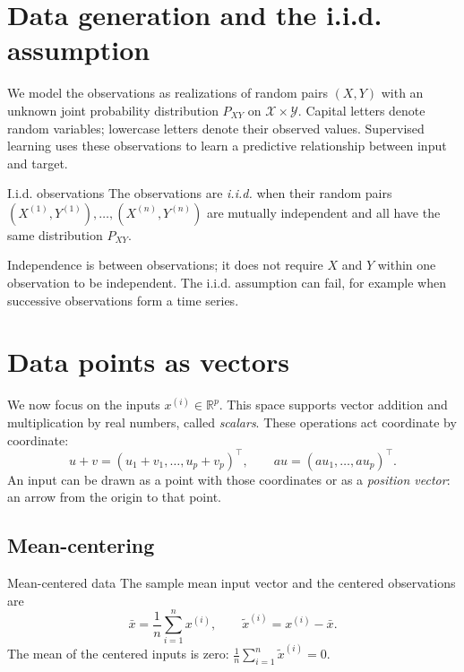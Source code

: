 \documentclass[a4paper,12pt,oneside]{report}
\begin{document}
\section{Data generation and the i.i.d. assumption}

We model the observations as realizations of random pairs $(X,Y)$
with an unknown joint probability distribution $P_{XY}$ on
$\mathcal{X}\times\mathcal{Y}$. Capital letters denote random variables;
lowercase letters denote their observed values. Supervised learning
uses these observations to learn a predictive relationship between
input and target.

\begin{frameddefn}{I.i.d. observations}
\label{def:iid}
The observations are \emph{i.i.d.} when their random pairs
$(X^{(1)},Y^{(1)}),\ldots,(X^{(n)},Y^{(n)})$ are mutually independent
and all have the same distribution $P_{XY}$.
\end{frameddefn}

Independence is between observations; it does not require $X$ and $Y$
within one observation to be independent. The i.i.d. assumption can fail,
for example when successive observations form a time series.

\clearpage
\section{Data points as vectors}

We now focus on the inputs $x^{(i)}\in\mathbb{R}^{p}$. This space
supports vector addition and multiplication by real numbers, called
\emph{scalars}. These operations act coordinate by coordinate:
\[
  u+v=(u_1+v_1,\ldots,u_p+v_p)^\top,
  \qquad
  a u=(a u_1,\ldots,a u_p)^\top.
\]
An input can be drawn as a point with those coordinates or as a
\emph{position vector}: an arrow from the origin to that point.

\subsection{Mean-centering}

\begin{frameddefn}{Mean-centered data}\label{def:mean-centering}
The sample mean input vector and the centered observations are
\[
  \bar{x}=\frac{1}{n}\sum_{i=1}^{n}x^{(i)},
  \qquad
  \widetilde{x}^{(i)}=x^{(i)}-\bar{x}.
\]
The mean of the centered inputs is zero:
$\frac{1}{n}\sum_{i=1}^{n}\widetilde{x}^{(i)}=0$.
\end{frameddefn}
\end{document}
